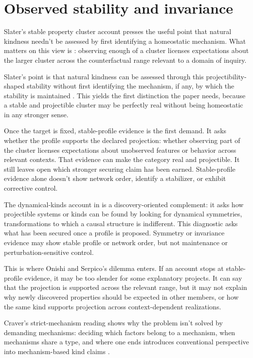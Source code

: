 \documentclass[12pt]{article}
\begin{document}
\section{Observed stability and invariance}

Slater's stable property cluster account presses the useful point that natural
kindness needn't be assessed by first identifying a homeostatic mechanism. What
matters on this view is : observing enough of a cluster
licenses expectations about the larger cluster across the counterfactual range
relevant to a domain of inquiry.

Slater's point is that natural kindness can be assessed through this
projectibility-shaped stability without first identifying the mechanism, if any,
by which the stability is maintained \citep{slater2015}. This yields the first
distinction the paper needs, because a stable and projectible cluster may be
perfectly real without being homeostatic in any stronger sense.

Once the target is fixed, stable-profile evidence is the first demand. It asks
whether the profile supports the declared projection: whether observing part of
the cluster licenses expectations about unobserved features or behavior across
relevant contexts. That evidence can make the category real and projectible. It
still leaves open which stronger securing claim has been earned. Stable-profile
evidence alone doesn't show network order, identify a stabilizer, or exhibit
corrective control.

The dynamical-kinds account in \textcite{jantzen2015} is a discovery-oriented
complement: it asks how projectible systems or kinds can be found by looking for
dynamical symmetries, transformations to which a causal structure is indifferent.
This diagnostic asks what has been secured once a profile is proposed.
Symmetry or invariance evidence may show stable profile or network order, but not
maintenance or perturbation-sensitive control.

This is where Onishi and Serpico's dilemma enters. If an account stops at
stable-profile evidence, it may be too slender for some explanatory projects. It
can say that the projection is supported across the relevant range, but it may
not explain why newly discovered properties should be expected in other members,
or how the same kind supports projection across context-dependent realizations.

Craver's strict-mechanism reading shows why the problem isn't solved by demanding
mechanisms: deciding which factors belong to a mechanism, when mechanisms share a
type, and where one ends introduces conventional perspective into mechanism-based
kind claims \citep{craver2009}.
\end{document}
